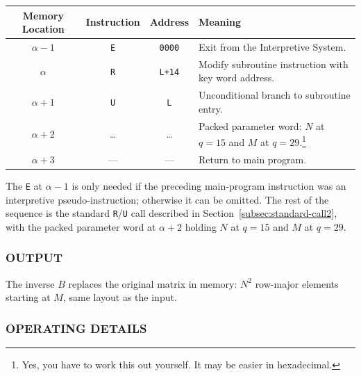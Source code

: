 \medskip
\begin{table}[h!]
\centering
\begin{tabularx}{\textwidth}{cccX}
\toprule
\textbf{Memory Location} & \textbf{Instruction} & \textbf{Address} & \textbf{Meaning} \\
\midrule
$\alpha - 1$      & \texttt{E}      & \texttt{0000}    & Exit from the Interpretive System. \\
$\alpha$          & \texttt{R}      & \texttt{L+14}    & Modify subroutine instruction with key word address. \\
$\alpha + 1$      & \texttt{U}      & \texttt{L}       & Unconditional branch to subroutine entry. \\
$\alpha + 2$      & \dots           & \dots            & Packed parameter word: $N$ at $q=15$ and $M$ at $q=29$.\footnote{Yes, you have to work this out yourself. It may be easier in hexadecimal.} \\
$\alpha + 3$      & ---              & ---              & Return to main program. \\
\bottomrule
\end{tabularx}
\end{table}

\medskip
\noindent
The \texttt{E} at $\alpha - 1$ is only needed if the preceding main-program instruction was an interpretive pseudo-instruction; otherwise it can be omitted. The rest of the sequence is the standard \texttt{R}/\texttt{U} call described in Section~\ref{subsec:standard-call2}, with the packed parameter word at $\alpha + 2$ holding $N$ at $q=15$ and $M$ at $q=29$.

\subsubsection*{OUTPUT}
The inverse $B$ replaces the original matrix in memory: $N^2$ row-major elements starting at $M$, same layout as the input.

\subsubsection*{OPERATING DETAILS}

